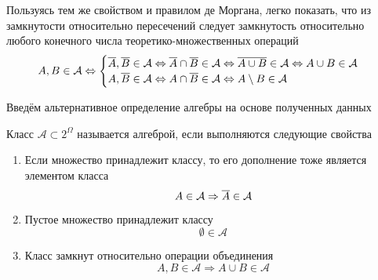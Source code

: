 \begin{remark}Пользуясь тем же свойством и правилом де Моргана, легко показать,
    что из замкнутости относительно пересечений
    следует замкнутость относительно любого конечного числа
    теоретико-множественных операций
    \begin{align*}
        A,B\in\mathcal{A}
        \Leftrightarrow
        \begin{cases}
            \overline{A},\overline{B}\in\mathcal{A}
            \Leftrightarrow\overline{A}\cap\overline{B}\in\mathcal{A}
            \Leftrightarrow\overline{A\cup B}\in\mathcal{A}
            \Leftrightarrow A\cup B\in\mathcal{A}\\
            A, \overline{B}\in\mathcal{A}
            \Leftrightarrow A\cap\overline{B}\in\mathcal{A}
            \Leftrightarrow A\setminus B\in\mathcal{A}
        \end{cases}
    \end{align*}
\end{remark}

Введём альтернативное определение алгебры на основе полученных данных
\begin{definition}[Алгебра]
    Класс $\mathcal{A}\subset2^\Omega$ называется алгеброй,
    если выполняются следующие свойства
    \begin{enumerate}
        \item Если множество принадлежит классу,
            то его дополнение тоже является элементом класса
            $$A\in\mathcal{A}\Rightarrow\overline{A}\in\mathcal{A}$$
        \item Пустое множество принадлежит классу
            $$\emptyset\in\mathcal{A}$$
        \item Класс замкнут относительно операции объединения
            $$A,B\in\mathcal{A}\Rightarrow A\cup B\in\mathcal{A}$$
    \end{enumerate}
\end{definition}

